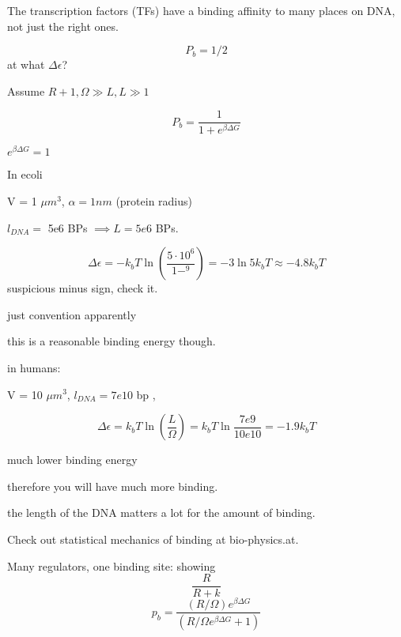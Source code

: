 \documentclass{article}
\begin{document}
The transcription factors (TFs) have a binding affinity to many places on DNA, not just the right ones.


\begin{equation}
	P_b = 1/2
\end{equation}
at what $\Delta \epsilon$?

Assume $R + 1,\Omega \gg L, L\gg 1$



\begin{equation}
	P_b = \frac{1}{1 + e^{\beta \Delta G}}
\end{equation}

$e ^ {\beta\Delta G}  = 1$  

In ecoli 

V = 1 $\mu m ^3$, $\alpha  = 1nm$ (protein radius)

$l_{DNA} =$ 5e6 BPs $\implies L = 5e6$ BPs.



\begin{equation}
	\Delta \epsilon  = -k_bT \ln(\frac{5\cdot 10^6}{1-^9}) = -3\ln5 k_bT \approx -4.8 k_bT
\end{equation}
suspicious minus sign, check it. 

just convention apparently

this is a reasonable binding energy though. 

in humans: 

V = 10 $\mu m ^3$, $l_{DNA} = 7e10 $ bp , 

\begin{equation}
	\Delta \epsilon = k_bT \ln(\frac{L}{\Omega}) = k_bT \ln \frac{7e9}{10e10} = -1.9k_bT
\end{equation}

much lower binding energy 

therefore you will have much more binding. 

the length of the DNA matters a lot for the amount of binding. 




Check out  statistical mechanics of binding at bio-physics.at. 




Many regulators, one binding site:
showing \begin{equation}
	\frac{R}{R+k}
\end{equation}
\begin{equation}
	p_b = \frac{(R/\Omega) e ^ {\beta\Delta G}}{(R/\Omega e ^ {\beta\Delta G} + 1)}
\end{equation}
\end{document}
